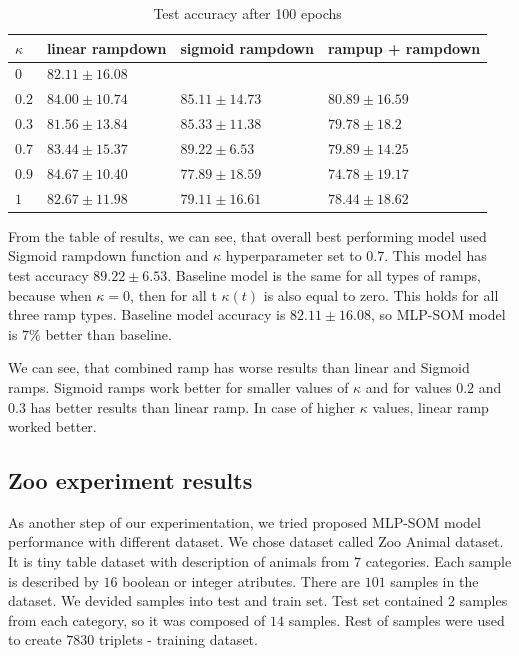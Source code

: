 \begin{table}[h!]
\centering
\begin{tabular}{|l|l|l|l|}
\hline
$\kappa$        & linear rampdown & sigmoid rampdown & rampup + rampdown \\ \hline
$0$   &  \color{purple} $82.11	\pm 16.08$ &                         &  \\ \hline
$0.2$ &  $84.00	\pm 10.74$ &  $85.11	\pm 14.73$   &  $80.89	\pm 16.59$ \\ \hline
$0.3$ &  $81.56	\pm 13.84$ &  $85.33	\pm 11.38$   &  $79.78	\pm 18.2$  \\ \hline
$0.7$ &  $83.44	\pm 15.37$ & \color{purple} $89.22	\pm  6.53$   &  $79.89	\pm 14.25$ \\ \hline
$0.9$ &  $84.67	\pm 10.40$ &  $77.89	\pm 18.59$   &  $74.78	\pm 19.17$ \\ \hline
$1$   &  $82.67	\pm 11.98$ &  $79.11	\pm 16.61$   &  $78.44	\pm 18.62$ \\ \hline

\end{tabular}
\caption{Test accuracy after 100 epochs}
\label{exp5-res-table}
\end{table}


From the table of results, we can see, that overall best performing model used Sigmoid rampdown function and $\kappa$ hyperparameter set to $0.7$. This model has test accuracy $89.22	\pm  6.53$. Baseline model is the same for all types of ramps, because when $\kappa = 0$, then for all t $\kappa(t)$ is also equal to zero. This holds for all three ramp types. Baseline model accuracy is $82.11	\pm 16.08$, so MLP-SOM model is $7\%$ better than baseline. 

We can see, that combined ramp has worse results than linear and Sigmoid ramps. Sigmoid ramps work better for smaller values of $\kappa$ and for values $0.2$ and $0.3$ has better results than linear ramp. In case of higher $\kappa$ values, linear ramp worked better.


\subsection{Zoo experiment results}
As another step of our experimentation, we tried proposed MLP-SOM model performance with different dataset. We chose dataset called Zoo Animal dataset. It is tiny table dataset with description of animals from $7$ categories. Each sample is described by $16$ boolean or integer atributes. There are $101$ samples in the dataset. We devided samples into test and train set. Test set contained $2$ samples from each category, so it was composed of $14$ samples. Rest of samples were used to create $7830$ triplets - training dataset.

